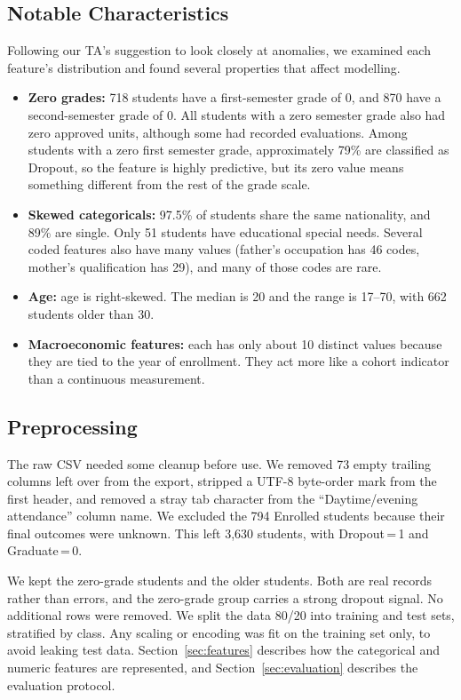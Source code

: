 \documentclass[11pt]{article}
\begin{document}
\subsection{Notable Characteristics}

Following our TA's suggestion to look closely at anomalies, we examined each feature's distribution and found several properties that affect modelling.

\begin{itemize}
  \item \textbf{Zero grades:} 718 students have a first-semester grade of 0, and 870 have a second-semester grade of 0.
    All students with a zero semester grade also had zero approved units, although some had recorded evaluations.
    Among students with a zero first semester grade, approximately 79\% are classified as Dropout, so the feature is highly predictive, but its zero value means something different from the rest of the grade scale.
  \item \textbf{Skewed categoricals:} 97.5\% of students share the same nationality, and 89\% are single.
    Only 51 students have educational special needs.
    Several coded features also have many values (father's occupation has 46 codes, mother's qualification has 29), and many of those codes are rare.
  \item \textbf{Age:} age is right-skewed.
    The median is 20 and the range is 17--70, with 662 students older than 30.
  \item \textbf{Macroeconomic features:} each has only about 10 distinct values because they are tied to the year of enrollment.
    They act more like a cohort indicator than a continuous measurement.
\end{itemize}

\subsection{Preprocessing}

The raw CSV needed some cleanup before use.
We removed 73 empty trailing columns left over from the export, stripped a UTF-8 byte-order mark from the first header, and removed a stray tab character from the ``Daytime/evening attendance'' column name.
We excluded the 794 Enrolled students because their final outcomes were unknown. This left 3,630 students, with Dropout\,=\,1 and Graduate\,=\,0.

We kept the zero-grade students and the older students.
Both are real records rather than errors, and the zero-grade group carries a strong dropout signal.
No additional rows were removed.
We split the data 80/20 into training and test sets, stratified by class.
Any scaling or encoding was fit on the training set only, to avoid leaking test data.
Section~\ref{sec:features} describes how the categorical and numeric features are represented, and Section~\ref{sec:evaluation} describes the evaluation protocol.
\end{document}
